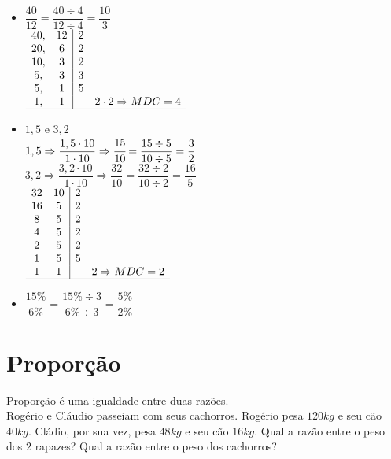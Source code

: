 \begin{enumerate}
\begin{itemize}
		\item $\dfrac{40}{12} = \dfrac{40 \div 4}{12 \div 4} = \dfrac{10}{3}$\\
		
		$\begin{array}{cc|cc}
		40, & 12 & 2 & \\ 
		20, & 6 & 2 & \\ 
		10, & 3 & 2 & \\
		5, & 3 & 3 & \\
		5, & 1 & 5 & \\
		1, & 1 &  & 2 \cdot 2 \Rightarrow MDC = 4 \\
		\hline
		\end{array}$\\
		
		\item $1,5$ e $ 3,2$\\
		
		$1,5 \Rightarrow \dfrac{1,5 \cdot 10}{1 \cdot 10} \Rightarrow \cfrac{15}{10} = \dfrac{15 \div 5}{10 \div 5} = \dfrac{3}{2}$\\
		
		
		$3,2 \Rightarrow \dfrac{3,2 \cdot 10}{1 \cdot 10} \Rightarrow \dfrac{32}{10} = \dfrac{32 \div 2}{10 \div 2} = \dfrac{16}{5}$ \\
		
			$\begin{array}{cc|cc}
		 32 & 10 & 2 & \\ 
		 16 & 5 & 2 & \\ 
		 8 & 5 & 2 & \\
		 4 & 5 & 2 & \\
		 2 & 5 & 2 & \\
		 1 & 5 & 5 & \\
		 1 & 1 &  & 2 \Rightarrow MDC = 2 \\
		 \hline  
		\end{array}$\\
		
		\item $\dfrac{15\%}{6\%} = \dfrac{15\% \div 3}{6\% \div 3} = \dfrac{5\%}{2\%}$
	\end{itemize}

\section{Proporção}

Proporção é uma igualdade entre duas razões.\\

Rogério e Cláudio passeiam com seus cachorros. Rogério pesa $120kg$ e seu cão $ 40kg $. Cládio, por sua vez, pesa $ 48kg $ e seu cão $ 16kg $. Qual a razão entre o peso dos $ 2 $ rapazes? Qual a razão entre o peso dos cachorros?\\


\end{enumerate}
